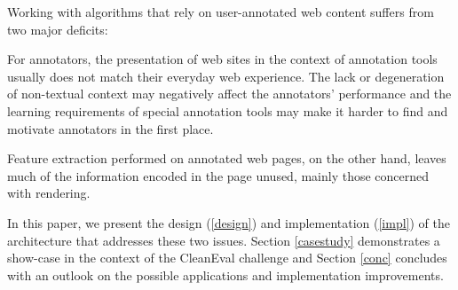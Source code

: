Working with algorithms that rely on user-annotated web content suffers from two major deficits:

For annotators, the presentation of web sites in the context of annotation tools usually does not match their everyday web experience.
The lack or degeneration of non-textual context may negatively affect the annotators' performance
and the learning requirements of special annotation tools may make it harder to find and motivate annotators in the first place.

Feature extraction performed on annotated web pages, on the other hand, leaves much of the information encoded in the page unused,
mainly those concerned with rendering.

In this paper, we present the design (\ref{design}) and implementation (\ref{impl}) of the {\KrdWrd} architecture that addresses these two issues.
Section \ref{casestudy} demonstrates a show-case in the context of the CleanEval challenge and Section \ref{conc} concludes with an outlook on the possible applications and implementation improvements.
